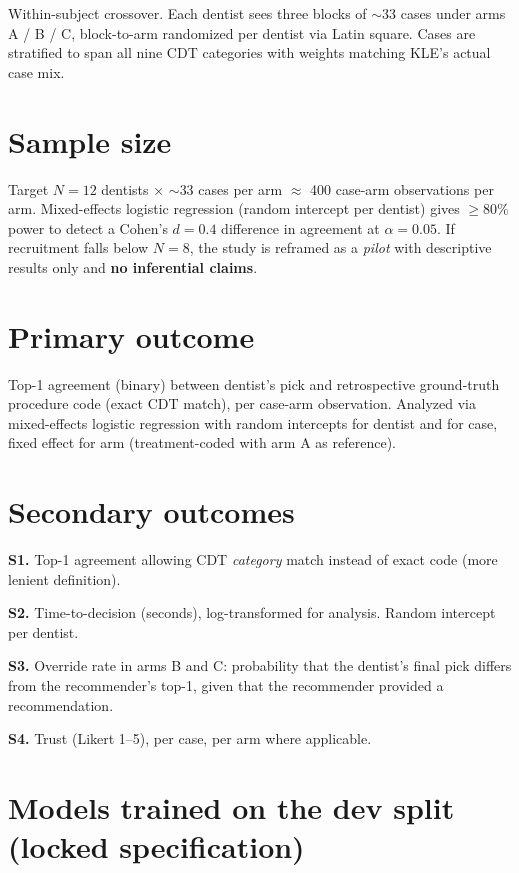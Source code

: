 \documentclass[11pt,letterpaper]{article}
\begin{document}
Within-subject crossover. Each dentist sees three blocks of $\sim$33 cases
under arms A / B / C, block-to-arm randomized per dentist via Latin square.
Cases are stratified to span all nine CDT categories with weights matching
KLE's actual case mix.

\section{Sample size}

Target $N = 12$ dentists $\times$ $\sim$33 cases per arm $\approx$ 400
case-arm observations per arm. Mixed-effects logistic regression (random
intercept per dentist) gives $\geq 80\%$ power to detect a Cohen's $d = 0.4$
difference in agreement at $\alpha = 0.05$. If recruitment falls below
$N = 8$, the study is reframed as a \textit{pilot} with descriptive results
only and \textbf{no inferential claims}.

\section{Primary outcome}

Top-1 agreement (binary) between dentist's pick and retrospective
ground-truth procedure code (exact CDT match), per case-arm observation.
Analyzed via mixed-effects logistic regression with random intercepts for
dentist and for case, fixed effect for arm (treatment-coded with arm A as
reference).

\section{Secondary outcomes}

\textbf{S1.} Top-1 agreement allowing CDT \textit{category} match instead of
exact code (more lenient definition).

\textbf{S2.} Time-to-decision (seconds), log-transformed for analysis.
Random intercept per dentist.

\textbf{S3.} Override rate in arms B and C: probability that the dentist's
final pick differs from the recommender's top-1, given that the recommender
provided a recommendation.

\textbf{S4.} Trust (Likert 1--5), per case, per arm where applicable.

\section{Models trained on the dev split (locked specification)}
\end{document}
